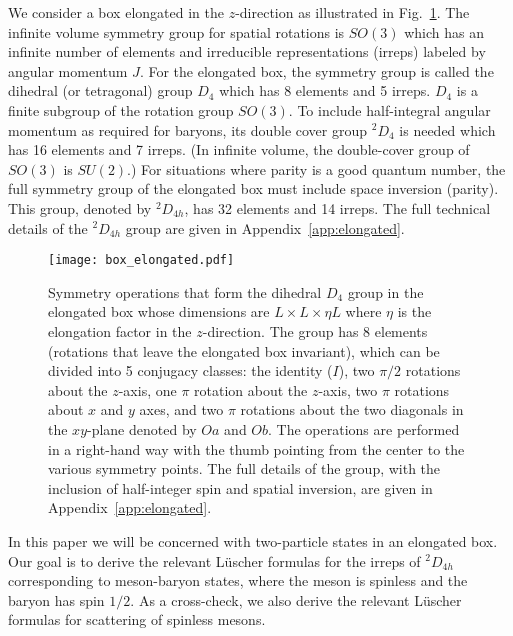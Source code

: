 \documentclass[aps,prd,reprint,showpacs,floatfix,longbibliography,,superscriptaddress]{revtex4-1}
\begin{document}
\begin{widetext}
We consider a box elongated in the $z$-direction as illustrated in Fig.~\ref{fig:box_elongated}.
The infinite volume symmetry group for spatial rotations is $SO(3)$ which has an infinite number of elements 
and irreducible representations (irreps) labeled by angular momentum $J$. %
For the elongated box, the symmetry group is called the dihedral (or tetragonal) group $D_{4}$ which has 8 elements and 5 irreps.
$D_{4}$ is a finite subgroup of the rotation group $SO(3)$.
To include half-integral angular momentum as required for baryons,  
its double cover group $^2D_{4}$ is needed which has 16 elements and 7 irreps. 
(In infinite volume, the double-cover group of $SO(3)$ is $SU(2)$.)
For situations where parity is a good quantum number, the full symmetry group of the elongated box must include space inversion (parity). This group, denoted by $^2D_{4h}$, has 32 elements
and 14 irreps.  The full technical details of the $^2D_{4h}$ group are given in Appendix~\ref{app:elongated}.
%
\begin{figure}
\texttt{[image: box\_elongated.pdf]}
\vspace{-3.5cm}
\caption{Symmetry operations that form the dihedral $D_4$ group in the elongated box whose dimensions are $L\times L \times \eta L$ where $\eta$ is the elongation factor in the $z$-direction. 
The group has 8 elements (rotations that leave the elongated box invariant), which can be divided into 5 conjugacy classes: 
the identity ($I$), two $\pi/2$ rotations about the $z$-axis, 
one $\pi$ rotation about the $z$-axis,  two $\pi$ rotations about $x$ and $y$ axes, and  two $\pi$  rotations about the two diagonals in the $xy$-plane denoted by $Oa$ and $Ob$. 
The operations are performed in a right-hand way with the thumb pointing from the center to the various symmetry points. 
The full details of the group, with the inclusion of half-integer spin and spatial inversion, 
are given in Appendix~\ref{app:elongated}.
}
\label{fig:box_elongated}
\end{figure}
%

In this paper we will be concerned with two-particle states in an elongated box. Our
goal is to derive the relevant L\"uscher formulas for the irreps of $^2D_{4h}$ corresponding
to meson-baryon states, where the meson is spinless and the baryon has spin
$1/2$. 
As a cross-check, we also derive  the relevant L\"uscher formulas for scattering
of spinless mesons.


\end{widetext}
\end{document}

